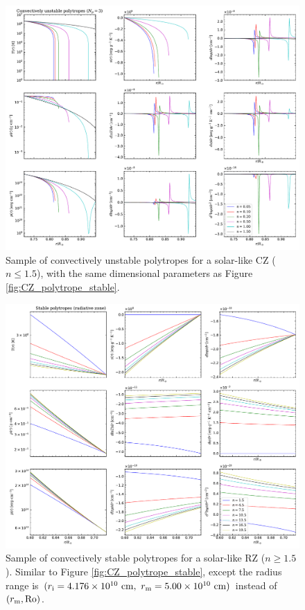 \documentclass[12pt]{article} %
\newcommand{\rrm}{r_{\rm{m}}}
\newcommand{\ri}{r_{\rm{i}}}
\begin{document}
  \begin{figure}
	\includegraphics[scale=0.6]{figures/CZ_polytrope_unstable.pdf}
	\caption{Sample of convectively unstable polytropes for a solar-like CZ ($n\leq1.5$), with the same dimensional parameters as Figure \ref{fig:CZ_polytrope_stable}.}
	\label{fig:CZ_polytrope_unstable}
\end{figure}

  \begin{figure}
	\includegraphics[scale=0.6]{figures/RZ_polytrope_stable.pdf}
	\caption{Sample of convectively stable polytropes for a solar-like RZ ($n\geq1.5$). Similar to Figure \ref{fig:CZ_polytrope_stable}, except the radius range is $(\ri=4.176\times10^{10}\ {\rm{cm}},\ \rrm=5.00\times10^{10}\ \rm{cm})$ instead of $(\rrm,\ro)$.}
	\label{fig:RZ_polytrope_stable}
\end{figure}
\end{document}
